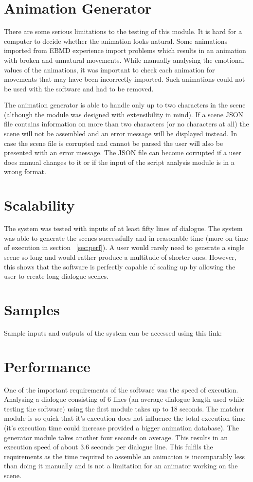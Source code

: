 \section{Animation Generator}
There are some serious limitations to the testing of this module. It is hard for a computer to decide whether the animation looks natural. Some animations imported from EBMD experience import problems which results in an animation with broken and unnatural movements. While manually analysing the emotional values of the animations, it was important to check each animation for movements that may have been incorrectly imported. Such animations could not be used with the software and had to be removed.

The animation generator is able to handle only up to two characters in the scene (although the module was designed with extensibility in mind). If a scene JSON file contains information on more than two characters (or no characters at all) the scene will not be assembled and an error message will be displayed instead. In case the scene file is corrupted and cannot be parsed the user will also be presented with an error message. The JSON file can become corrupted if a user does manual changes to it or if the input of the script analysis module is in a wrong format.

\section{Scalability}
The system was tested with inputs of at least fifty lines of dialogue. The system was able to generate the scenes successfully and in reasonable time (more on time of execution in section ~\ref{sec:perf}). A user would rarely need to generate a single scene so long and would rather produce a multitude of shorter ones. However, this shows that the software is perfectly capable of scaling up by allowing the user to create long dialogue scenes.

\section{Samples}
Sample inputs and outputs of the system can be accessed using this link: \videoshost

\section{Performance \label{sec:perf}}
One of the important requirements of the software was the speed of execution. Analysing a dialogue consisting of 6 lines (an average dialogue length used while testing the software) using the first module takes up to 18 seconds. The matcher module is so quick that it's execution does not influence the total execution time (it's execution time could increase provided a bigger animation database). The generator module takes another four seconds on average. This results in an execution speed of about 3.6 seconds per dialogue line. This fulfils the requirements as the time required to assemble an animation is incomparably less than doing it manually and is not a limitation for an animator working on the scene.